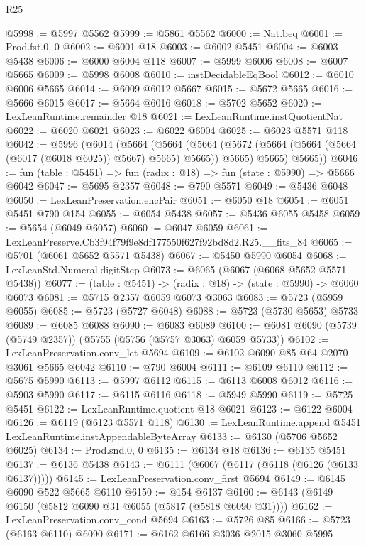 \begin{lexlean}{R25}
\begin{coremodule}
@5998 := @5997 @5562
@5999 := @5861 @5562
@6000 := Nat.beq
@6001 := Prod.fst.{0, 0}
@6002 := @6001 @18
@6003 := @6002 @5451
@6004 := @6003 @5438
@6006 := @6000 @6004 @118
@6007 := @5999 @6006
@6008 := @6007 @5665
@6009 := @5998 @6008
@6010 := instDecidableEqBool
@6012 := @6010 @6006 @5665
@6014 := @6009 @6012 @5667
@6015 := @5672 @5665
@6016 := @5666 @6015
@6017 := @5664 @6016
@6018 := @5702 @5652
@6020 := LexLeanRuntime.remainder @18
@6021 := LexLeanRuntime.instQuotientNat
@6022 := @6020 @6021
@6023 := @6022 @6004
@6025 := @6023 @5571 @118
@6042 := @5996
    (@6014
      (@5664
        (@5664
          (@5664 (@5672 (@5664 (@5664 (@5664 (@6017 (@6018 @6025)) @5667) @5665) @5665)) @5665)
          @5665)
        @5665))
@6046 := fun (table : @5451) => fun (radix : @18) => fun (state : @5990) => @5666 @6042
@6047 := @5695 @2357
@6048 := @790 @5571
@6049 := @5436 @6048
@6050 := LexLeanPreservation.encPair
@6051 := @6050 @18
@6054 := @6051 @5451 @790 @154
@6055 := @6054 @5438
@6057 := @5436 @6055 @5458
@6059 := @5654 (@6049 @6057)
@6060 := @6047 @6059
@6061 := LexLeanPreserve.Cb3f94f79f9e8df177550f627f92bd8d2.R25.__fits_84
@6065 := @5701 (@6061 @5652 @5571 @5438)
@6067 := @5450 @5990 @6054
@6068 := LexLeanStd.Numeral.digitStep
@6073 := @6065 (@6067 (@6068 @5652 @5571 @5438))
@6077 := (table : @5451) -> (radix : @18) -> (state : @5990) -> @6060 @6073
@6081 := @5715 @2357 @6059 @6073 @3063
@6083 := @5723 (@5959 @6055)
@6085 := @5723 (@5727 @6048)
@6088 := @5723 (@5730 @5653) @5733
@6089 := @6085 @6088
@6090 := @6083 @6089
@6100 := @6081 @6090 (@5739 (@5749 @2357)) (@5755 (@5756 (@5757 @3063) @6059 @5733))
@6102 := LexLeanPreservation.conv_let @5694
@6109 := @6102 @6090 @85 @64 @2070 @3061 @5665 @6042
@6110 := @790 @6004
@6111 := @6109 @6110
@6112 := @5675 @5990
@6113 := @5997 @6112
@6115 := @6113 @6008 @6012
@6116 := @5903 @5990
@6117 := @6115 @6116
@6118 := @5949 @5990
@6119 := @5725 @5451
@6122 := LexLeanRuntime.quotient @18 @6021
@6123 := @6122 @6004
@6126 := @6119 (@6123 @5571 @118)
@6130 := LexLeanRuntime.append @5451 LexLeanRuntime.instAppendableByteArray
@6133 := @6130 (@5706 @5652 @6025)
@6134 := Prod.snd.{0, 0}
@6135 := @6134 @18
@6136 := @6135 @5451
@6137 := @6136 @5438
@6143 := @6111 (@6067 (@6117 (@6118 (@6126 (@6133 @6137)))))
@6145 := LexLeanPreservation.conv_first @5694
@6149 := @6145 @6090 @522 @5665 @6110
@6150 := @154 @6137
@6160 := @6143 (@6149 @6150 (@5812 @6090 @31 @6055 (@5817 (@5818 @6090 @31))))
@6162 := LexLeanPreservation.conv_cond @5694
@6163 := @5726 @85
@6166 := @5723 (@6163 @6110) @6090
@6171 := @6162 @6166 @3036 @2015 @3060 @5995

\end{coremodule}
\end{lexlean}
